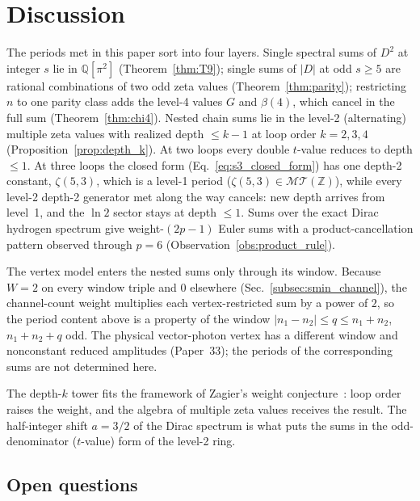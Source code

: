 \documentclass[11pt]{article}
\newcommand{\MT}{\mathcal{MT}}
\newcommand{\Z}{\mathbb{Z}}
\begin{document}
\section{Discussion}
\label{sec:discussion}

The periods met in this paper sort into four layers.  Single spectral
sums of $D^2$ at integer $s$ lie in $\mathbb{Q}[\pi^2]$
(Theorem~\ref{thm:T9}); single sums of $|D|$ at odd $s \ge 5$ are
rational combinations of two odd zeta values (Theorem~\ref{thm:parity});
restricting $n$ to one parity class adds the level-4 values $G$ and
$\beta(4)$, which cancel in the full sum (Theorem~\ref{thm:chi4}).
Nested chain sums lie in the level-2 (alternating) multiple zeta
values with realized depth $\le k-1$ at loop order $k = 2, 3, 4$
(Proposition~\ref{prop:depth_k}).  At two loops every double $t$-value
reduces to depth $\le 1$.  At three loops the closed form
(Eq.~\eqref{eq:s3_closed_form}) has one depth-2 constant, $\zeta(5,3)$,
which is a level-1 period ($\zeta(5,3) \in \MT(\Z)$), while every
level-2 depth-2 generator met along the way cancels: new depth arrives
from level~1, and the $\ln 2$ sector stays at depth $\le 1$.  Sums over
the exact Dirac hydrogen spectrum give weight-$(2p{-}1)$ Euler sums with
a product-cancellation pattern observed through $p = 6$
(Observation~\ref{obs:product_rule}).

The vertex model enters the nested sums only through its window.
Because $W = 2$ on every window triple and $0$ elsewhere
(Sec.~\ref{subsec:smin_channel}), the channel-count weight multiplies
each vertex-restricted sum by a power of $2$, so the period content
above is a property of the window
$|n_1 - n_2| \le q \le n_1 + n_2$, $n_1 + n_2 + q$ odd.  The physical
vector-photon vertex has a different window and nonconstant reduced
amplitudes (Paper~33); the periods of the corresponding sums are not
determined here.

The depth-$k$ tower fits the framework of Zagier's weight
conjecture~\cite{zagier1994}: loop order raises the weight, and the
algebra of multiple zeta values receives the result.  The half-integer
shift $a = 3/2$ of the Dirac spectrum is what puts the sums in the
odd-denominator ($t$-value) form of the level-2 ring.

\subsection{Open questions}
\end{document}
